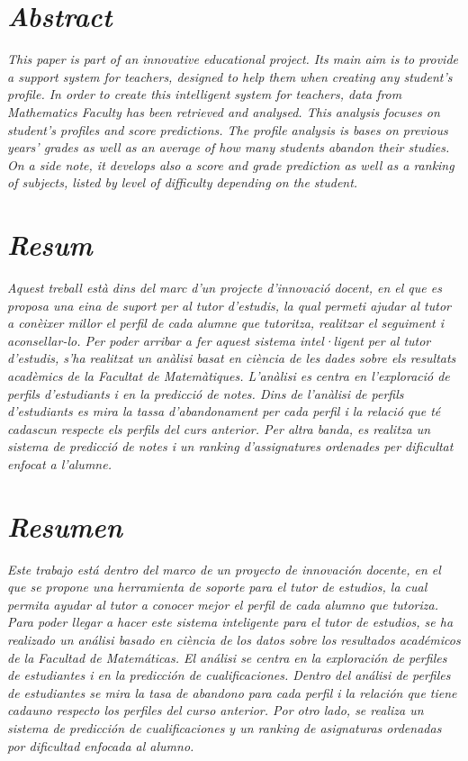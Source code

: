 \documentclass[12pt,a4paper,catalan]{article}
\begin{document}

\section*{\textit{Abstract}}

\textit{This paper is part of an innovative educational project. Its main aim is to provide a support system for teachers, designed to help them when creating any student's profile. In order to create this intelligent system for teachers, data from Mathematics Faculty has been retrieved and analysed. This analysis focuses on student's profiles and score predictions. The profile analysis is bases on previous years' grades as well as an average of how many students abandon their studies. On a side note, it develops also a score and grade prediction as well as a ranking of subjects, listed by level of difficulty depending on the student.}

\section*{\textit{Resum}}
\textit{Aquest treball està dins del marc d'un projecte d'innovació docent, en el que es proposa una eina de suport per al tutor d'estudis, la qual permeti ajudar al tutor a conèixer millor el perfil de cada alumne que tutoritza, realitzar el seguiment i aconsellar-lo. Per poder arribar a fer aquest sistema intel·ligent per al tutor d'estudis, s'ha realitzat un anàlisi basat en ciència de les dades sobre els resultats acadèmics de la Facultat de Matemàtiques. L'anàlisi es centra en l'exploració de perfils d'estudiants i en la predicció de notes. Dins de l'anàlisi de perfils d'estudiants es mira la tassa d'abandonament per cada perfil i la relació que té cadascun respecte els perfils del curs anterior. Per altra banda, es realitza un sistema de predicció de notes i un ranking d'assignatures ordenades per dificultat enfocat a l'alumne.}

\section*{\textit{Resumen}}
\textit{Este trabajo está dentro del marco de un proyecto de innovación docente, en el que se propone una herramienta de soporte para el tutor de estudios, la cual permita ayudar al tutor a conocer mejor el perfil de cada alumno que tutoriza. Para poder llegar a hacer este sistema inteligente para el tutor de estudios, se ha realizado un análisi basado en ciència de los datos sobre los resultados académicos de la Facultad de Matemáticas. El análisi se centra en la exploración de perfiles de estudiantes i en la predicción de cualificaciones. Dentro del análisi de perfiles de estudiantes se mira la tasa de abandono para cada perfil i la relación que tiene cadauno respecto los perfiles del curso anterior. Por otro lado, se realiza un sistema de predicción de cualificaciones y un ranking de asignaturas ordenadas por dificultad enfocada al alumno.}
\end{document}

